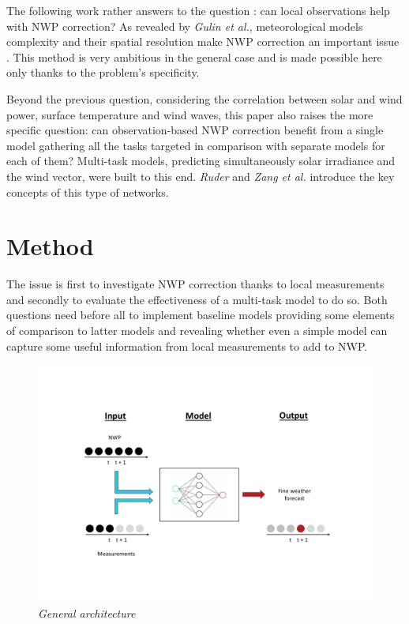 \documentclass{article}
\newcommand{\saut}{\vspace{10px}}
\begin{document}
\saut

The following work rather answers to the question : can local observations help with NWP correction?
As revealed by \emph{Gulin et al.}, meteorological models complexity and their spatial resolution make NWP
correction an important issue \cite{gulin_predictor-corrector_2015}. This method is very ambitious in the general case and
is made possible here only thanks to the problem's specificity.

\saut

Beyond the previous question, considering the correlation between solar and wind power,
surface temperature and wind waves, this paper also raises the more specific question: can
observation-based NWP correction benefit from a single model gathering all the tasks targeted in comparison with
separate models for each of them? Multi-task models, predicting simultaneously solar irradiance and the wind vector,
were built to this end. \emph{Ruder} \cite{ruder_overview_2017} and \emph{Zang et al.} \cite{zhang_overview_2018}
introduce the key concepts of this type of networks.

\section{Method}

The issue is first to investigate NWP correction thanks to local measurements and secondly to evaluate
the effectiveness of a multi-task model to do so. Both questions need before all to implement baseline models
providing some elements of comparison to latter models and revealing whether even a simple model can
capture some useful information from local measurements to add to NWP.

\vspace{-30px}

\begin{figure}[H]
    \centering
    \includegraphics[width=\linewidth]{img/structure.pdf}
    \vspace{-30px}
    \caption{\textit{General architecture}}
   \label{fig:Fig. 1}
\end{figure}
\end{document}
